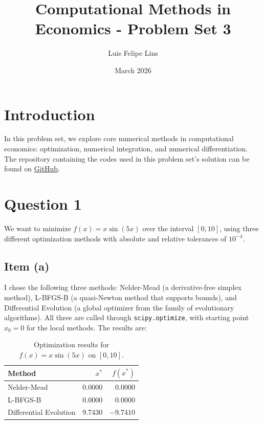 \documentclass{article}
\title{Computational Methods in Economics - Problem Set 3}
\author{Luis Felipe Lins}
\date{March 2026}
\begin{document}
\maketitle

\section*{Introduction}

In this problem set, we explore core numerical methods in computational economics: optimization, numerical integration, and numerical differentiation. The repository containing the codes used in this problem set's solution can be found on \href{https://github.com/luisfelipelins/Computational-Methods-in-Economics}{GitHub}.


\section{Question 1}
\label{sec:q1}

We want to minimize $f(x) = x\sin(5x)$ over the interval $[0,10]$, using three different optimization methods with absolute and relative tolerances of $10^{-4}$.

\subsection*{Item (a)}

I chose the following three methods: Nelder-Mead (a derivative-free simplex method), L-BFGS-B (a quasi-Newton method that supports bounds), and Differential Evolution (a global optimizer from the family of evolutionary algorithms). All three are called through \lstinline|scipy.optimize|, with starting point $x_0 = 0$ for the local methods. The results are:

\begin{table}[h!]
\centering
\begin{tabular}{lrr}
    \toprule
    Method & $x^*$ & $f(x^*)$ \\
    \midrule
    Nelder-Mead            & 0.0000 & 0.0000 \\
    L-BFGS-B               & 0.0000 & 0.0000 \\
    Differential Evolution & 9.7430 & $-9.7410$ \\
    \bottomrule
\end{tabular}
\caption{Optimization results for $f(x) = x\sin(5x)$ on $[0,10]$.}
\label{tab:q1_methods}
\end{table}
\end{document}

